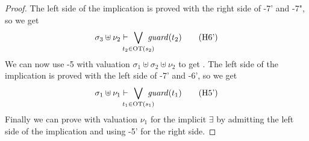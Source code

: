 \documentclass{article}
\begin{document}
\begin{proof}
The left side of the implication is proved with the right side of \hyp{7'} and \hyp{7"}, so we get
\[ \sigma_3 \uplus \nu_2 \vdash \bigvee_\subbox{t_2 \in \fOT{s_2}} \fguard{t_2} \hyp{6'} \]
We can now use \hyp{5} with valuation \(\sigma_1 \uplus \sigma_2 \uplus \nu_2\) to get .
The left side of the implication is proved with the left side of \hyp{7'} and \hyp{6'}, so we get
\[ \sigma_1 \uplus \nu_1 \vdash \bigvee_\subbox{t_1 \in \fOT{s_1}} \fguard{t_1} \hyp{5'} \]
Finally we can prove  with valuation \(\nu_1\) for the implicit \(\exists\) by admitting the left side of the implication and using \hyp{5'} for the right side.
\end{proof}
\end{document}
